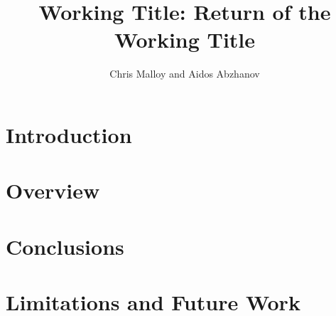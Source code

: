 \documentclass[twocolumn,11pt,notitlepage,oneside]{article}
\title{Working Title: Return of the Working Title}
\author{Chris Malloy and Aidos Abzhanov}
\date{}
\begin{document}
\section{Introduction}


\section{Overview}


\section{Conclusions}


\section{Limitations and Future Work}

\end{document}
